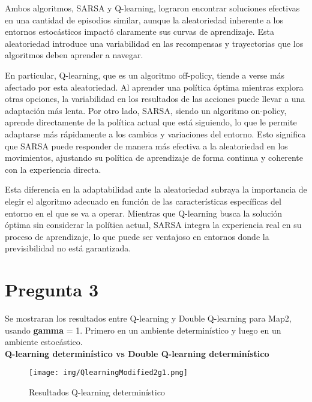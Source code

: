 \documentclass[
	spanish, %
	oneside
]{article}
\begin{document}
\newpage
\noindent Ambos algoritmos, SARSA y Q-learning, lograron encontrar soluciones efectivas en una cantidad de episodios similar, aunque la aleatoriedad inherente a los entornos estocásticos impactó claramente sus curvas de aprendizaje. Esta aleatoriedad introduce una variabilidad en las recompensas y trayectorias que los algoritmos deben aprender a navegar.
\vspace*{12pt}

\noindent En particular, Q-learning, que es un algoritmo off-policy, tiende a verse más afectado por esta aleatoriedad. Al aprender una política óptima mientras explora otras opciones, la variabilidad en los resultados de las acciones puede llevar a una adaptación más lenta. Por otro lado, SARSA, siendo un algoritmo on-policy, aprende directamente de la política actual que está siguiendo, lo que le permite adaptarse más rápidamente a los cambios y variaciones del entorno. Esto significa que SARSA puede responder de manera más efectiva a la aleatoriedad en los movimientos, ajustando su política de aprendizaje de forma continua y coherente con la experiencia directa.
\vspace*{12pt}

\noindent Esta diferencia en la adaptabilidad ante la aleatoriedad subraya la importancia de elegir el algoritmo adecuado en función de las características específicas del entorno en el que se va a operar. Mientras que Q-learning busca la solución óptima sin considerar la política actual, SARSA integra la experiencia real en su proceso de aprendizaje, lo que puede ser ventajoso en entornos donde la previsibilidad no está garantizada.

\newpage
\section*{Pregunta 3}

\noindent Se mostraran los resultados entre Q-learning y Double Q-learning para Map2, usando \textbf{gamma} = 1. Primero en un ambiente determinístico y luego en un ambiente estocástico. \\


\indent\textbf{Q-learning determinístico vs Double Q-learning determinístico}

\begin{figure}[H]
	\centering
	\texttt{[image: img/QlearningModified2g1.png]}
	\caption{Resultados Q-learning determinístico}
	\label{fig:map2_qlearning_modified23}
\end{figure}
\end{document}
